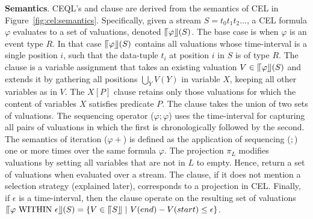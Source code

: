 \textbf{Semantics}. CEQL's  and  clause are derived from the semantics of CEL in Figure~\ref{fig:cel:semantics}. Specifically, given a stream $S = t_{0}t_{1}t_{2} \ldots $, a CEL formula $\varphi$ evaluates to a set of valuations, denoted $\llceil \varphi \rrfloor(S)$. The base case is when $\varphi$ is an event type $R$. In that case $\llceil \varphi \rrfloor(S)$ contains all valuations whose time-interval is a single position $i$, such that the data-tuple $t_{i}$ at position $i$ in $S$ is of type $R$. The  clause is a variable assignment that takes an existing valuation $V \in \llceil \varphi \rrfloor(S)$ and extends it by gathering all positions $\bigcup_{Y}V(Y)$ in variable $X$, keeping all other variables as in $V$. The  $X[P]$ clause retains only those valuations for which the content of variables $X$ satisfies predicate $P$. The  clause takes the union of two sets of valuations. The sequencing operator ($\varphi;\varphi$) uses the time-interval for capturing all pairs of valuations in which the first is chronologically followed by the second. The semantics of iteration ($\varphi+$) is defined as the application of sequencing ($;$) one or more times over the same formula $\varphi$. The projection $\pi_{L}$ modifies valuations by setting all variables that are not in $L$ to empty. Hence,  return a set of valuations when evaluated over a stream. The  clause, if it does not mention a selection strategy (explained later), corresponds to a projection in CEL. Finally, if $\epsilon$ is a time-interval, then the  clause operate on the resulting set of valuations $\InSBrackets{\varphi \ \text{WITHIN} \ \epsilon}(S) = \{ V \in \InSBrackets{S} \ | \ V(end) - V(start) \le \epsilon \}$.

